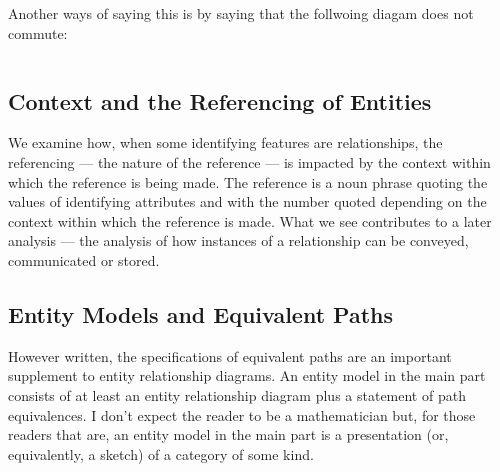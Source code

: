 Another ways of saying this is by saying that the follwoing diagam does not commute:
\begin{equation*}

\end{equation*}

\begin{equation*}

\end{equation*}

\subsection{Context and the Referencing of Entities}
\mynote
We examine how,  when some identifying features are relationships, the referencing 
--- the nature of the reference ---   
is impacted by the context within which the reference is being made. 
The reference is  a noun phrase quoting the values of identifying attributes
and with the number quoted depending on 
the context within which the reference is made.
What we see contributes to a later analysis --- the analysis of  how 
instances of a relationship can be conveyed, communicated or stored.
\subsection{Entity Models and Equivalent Paths}
\mynote
However written,  the specifications of equivalent paths are
an important supplement to entity relationship diagrams. 
An entity model in the main part consists of at least an entity relationship diagram  
plus a statement of path equivalences.
\mynote
I don't expect the reader to be a mathematician but, for those readers that are, an entity model in the main part is a presentation 
(or, equivalently, a sketch) of a category of some kind. 